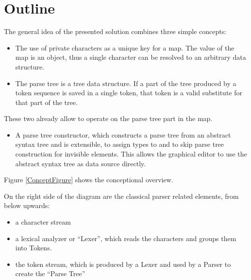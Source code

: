 \section{Outline}
The general idea of the presented solution combines three simple concepts:
\begin{itemize}
	\item The use of private characters as a unique key for a map. The value of the map is an object, thus a single character can be resolved to an arbitrary data structure.
	\item The parse tree is a tree data structure. If a part of the tree produced by a token sequence is saved in a single token, that token is a valid substitute for that part of the tree.
\end{itemize}
These two already allow to operate on the parse tree part in the map.
\begin{itemize}
	\item A parse tree constructor, which constructs a parse tree from an abstract syntax tree and is extensible, to assign types to and to skip parse tree construction for invisible elements. This allows the graphical editor to use the abstract syntax tree as data source directly. 
\end{itemize}

Figure \ref{ConceptFigure} shows the conceptional overview. 

On the right side of the diagram are the classical parser related elements, from below upwards:
\begin{itemize}
	\item a character stream
	\item a lexical analyzer or ``Lexer'', which reads the characters and groups them into Tokens.
	\item the token stream, which is produced by a Lexer and used by a Parser to create the ``Parse Tree''
\end{itemize}

